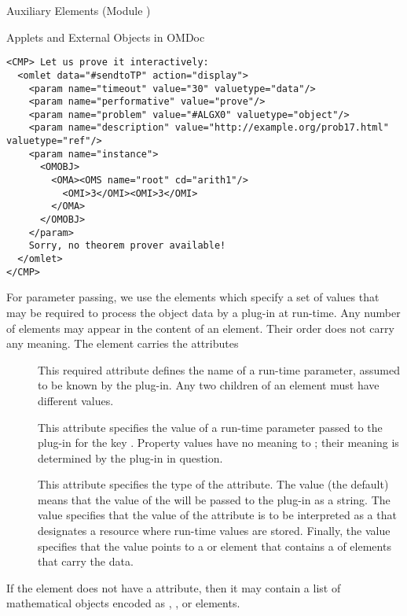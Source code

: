 \begin{tchapter}[id=ext,short=Auxiliary Elements]{Auxiliary Elements (Module {})}
\begin{tsection}[id=applets]{Applets and External Objects in OMDoc}
\begin{lstlisting}[label=lst:omlet2,mathescape,
  caption={An {\element{omlet}} for Connecting to a Theorem Prover},
  index={omlet}]
<CMP> Let us prove it interactively:
  <omlet data="#sendtoTP" action="display">
    <param name="timeout" value="30" valuetype="data"/>
    <param name="performative" value="prove"/>
    <param name="problem" value="#ALGX0" valuetype="object"/>
    <param name="description" value="http://example.org/prob17.html" valuetype="ref"/>
    <param name="instance">
      <OMOBJ>
        <OMA><OMS name="root" cd="arith1"/>
          <OMI>3</OMI><OMI>3</OMI>
        </OMA>
      </OMOBJ>
    </param>   
    Sorry, no theorem prover available!
  </omlet>
</CMP>
\end{lstlisting}

For parameter passing, we use the {} elements which specify a set of values
that may be required to process the object data by a plug-in at run-time. Any number of
{} elements may appear in the content of an {}
element. Their order does not carry any meaning. The {} element carries the
attributes
\begin{description}
\item[{}] This required attribute defines the name of a
  run-time parameter, assumed to be known by the plug-in. Any two {}
  children of an {} element must have different
  {} values.
\item[{}] This attribute specifies the value of a run-time
  parameter passed to the plug-in for the key {}. Property
  values have no meaning to {\omdoc}; their meaning is determined by the plug-in in
  question.
\item[{}] This attribute specifies the type of the
  {} attribute. The value
  {} (the default) means that the value of the
  {} will be passed to the plug-in as a string.  The value
  {} specifies that the value of the
  {} attribute is to be interpreted as a
  {} that designates a resource where run-time values are
  stored. Finally, the value {} specifies that
  the {} value points to a {} or
  {} element that contains a {} of
  {} elements that carry the data.
\end{description}
If the {} element does not have a {}
attribute, then it may contain a list of mathematical objects encoded as
{}, {}, or {} elements.
\end{tsection}


\end{tchapter}
